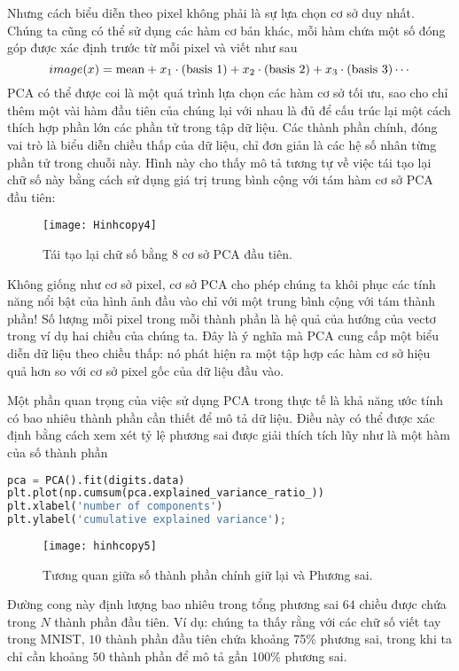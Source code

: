 Nhưng cách biểu diễn theo pixel không phải là sự lựa chọn cơ sở duy nhất. Chúng ta cũng có thể sử dụng các hàm cơ bản khác, mỗi hàm chứa một số đóng góp được xác định trước từ mỗi pixel và viết như sau
$$image(x) = {\rm mean} + x_1 \cdot{\rm (basis~1)} + x_2 \cdot{\rm (basis~2)} + x_3 \cdot{\rm (basis~3)} \cdots$$
PCA có thể được coi là một quá trình lựa chọn các hàm cơ sở tối ưu, sao cho chỉ thêm một vài hàm đầu tiên của chúng lại với nhau là đủ để cấu trúc lại một cách thích hợp phần lớn các phần tử trong tập dữ liệu. Các thành phần chính, đóng vai trò là biểu diễn chiều thấp của dữ liệu, chỉ đơn giản là các hệ số nhân từng phần tử trong chuỗi này. Hình này cho thấy mô tả tương tự về việc tái tạo lại chữ số này bằng cách sử dụng giá trị trung bình cộng với tám hàm cơ sở PCA đầu tiên:

\begin{figure}[htb]
	\centering
	\texttt{[image: Hinhcopy4]}
	\caption{Tái tạo lại chữ số bằng 8 cơ sở PCA đầu tiên.}
	\label{fig:hinhcopy4}
\end{figure}
Không giống như cơ sở pixel, cơ sở PCA cho phép chúng ta khôi phục các tính năng nổi bật của hình ảnh đầu vào chỉ với một trung bình cộng với tám thành phần! Số lượng mỗi pixel trong mỗi thành phần là hệ quả của hướng của vectơ trong ví dụ hai chiều của chúng ta. Đây là ý nghĩa mà PCA cung cấp một biểu diễn dữ liệu theo chiều thấp: nó phát hiện ra một tập hợp các hàm cơ sở hiệu quả hơn so với cơ sở pixel gốc của dữ liệu đầu vào.

Một phần quan trọng của việc sử dụng PCA trong thực tế là khả năng ước tính có bao nhiêu thành phần cần thiết để mô tả dữ liệu. Điều này có thể được xác định bằng cách xem xét tỷ lệ phương sai được giải thích tích lũy như là một hàm của số thành phần
\begin{lstlisting}[language=Python]
pca = PCA().fit(digits.data)
plt.plot(np.cumsum(pca.explained_variance_ratio_))
plt.xlabel('number of components')
plt.ylabel('cumulative explained variance');
\end{lstlisting}
\begin{figure}[htb]
	\centering
	\texttt{[image: hinhcopy5]}
	\caption{Tương quan giữa số thành phần chính giữ lại và Phương sai.}
	\label{fig:hinhcopy5}
\end{figure}
Đường cong này định lượng bao nhiêu trong tổng phương sai $64$ chiều được chứa trong $N$ thành phần đầu tiên. Ví dụ: chúng ta thấy rằng với các chữ số viết tay trong MNIST, $10$ thành phần đầu tiên chứa khoảng 75\% phương sai, trong khi ta chỉ cần khoảng $50$ thành phần để mô tả gần 100\% phương sai.

